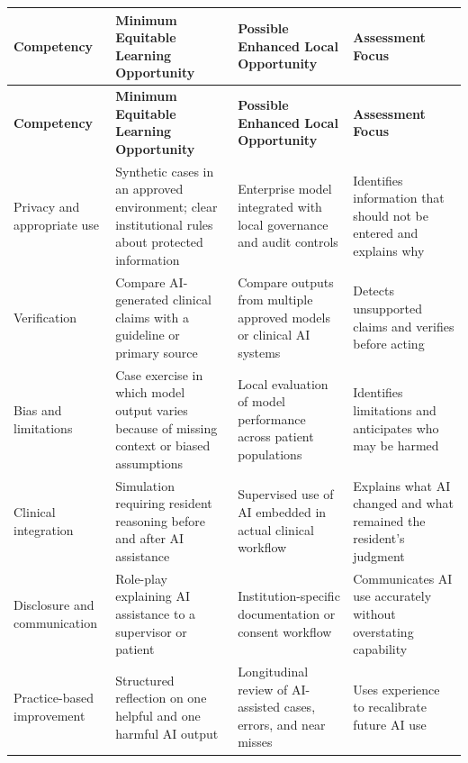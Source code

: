 \documentclass[12pt]{article}
\begin{document}
\begin{longtable}{
  p{}
  p{}
  p{}
  p{}
}
\toprule
\textbf{Competency}
&
\textbf{Minimum Equitable Learning Opportunity}
&
\textbf{Possible Enhanced Local Opportunity}
&
\textbf{Assessment Focus}
\\
\midrule
\endfirsthead

\toprule
\textbf{Competency}
&
\textbf{Minimum Equitable Learning Opportunity}
&
\textbf{Possible Enhanced Local Opportunity}
&
\textbf{Assessment Focus}
\\
\midrule
\endhead

Privacy and appropriate use
&
Synthetic cases in an approved environment; clear institutional rules about
protected information
&
Enterprise model integrated with local governance and audit controls
&
Identifies information that should not be entered and explains why
\\

Verification
&
Compare AI-generated clinical claims with a guideline or primary source
&
Compare outputs from multiple approved models or clinical AI systems
&
Detects unsupported claims and verifies before acting
\\

Bias and limitations
&
Case exercise in which model output varies because of missing context or biased
assumptions
&
Local evaluation of model performance across patient populations
&
Identifies limitations and anticipates who may be harmed
\\

Clinical integration
&
Simulation requiring resident reasoning before and after AI assistance
&
Supervised use of AI embedded in actual clinical workflow
&
Explains what AI changed and what remained the resident's judgment
\\

Disclosure and communication
&
Role-play explaining AI assistance to a supervisor or patient
&
Institution-specific documentation or consent workflow
&
Communicates AI use accurately without overstating capability
\\

Practice-based improvement
&
Structured reflection on one helpful and one harmful AI output
&
Longitudinal review of AI-assisted cases, errors, and near misses
&
Uses experience to recalibrate future AI use
\\

\bottomrule
\end{longtable}
\end{document}
